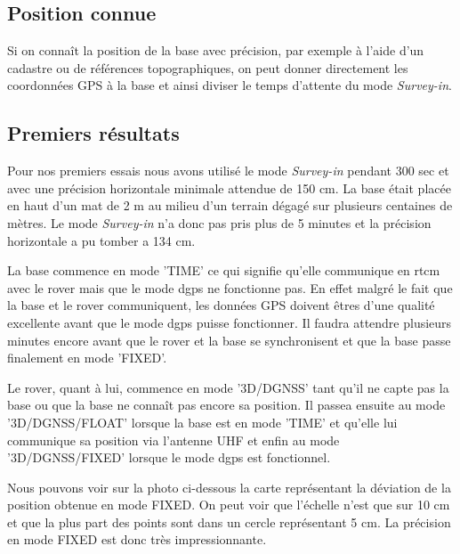 \subsection{Position connue}
Si on connaît la position de la base avec précision, par exemple à l'aide d'un
cadastre ou de références topographiques, on peut donner directement les
coordonnées GPS à la base et ainsi diviser le temps d'attente du mode
\textit{Survey-in}.


\subsection{Premiers résultats}
Pour nos premiers essais nous avons utilisé le mode \textit{Survey-in} pendant
300 sec et avec une précision horizontale minimale attendue de 150 cm. La base
était placée en haut d'un mat de 2 m au milieu d'un terrain dégagé sur
plusieurs centaines de mètres. Le mode \textit{Survey-in} n'a donc pas pris
plus de 5 minutes et la précision horizontale a pu tomber a 134 cm.

La base commence en mode 'TIME' ce qui signifie qu'elle communique en
\gls{rtcm} avec le rover mais que le mode \gls{dgps} ne fonctionne pas. En
effet malgré le fait que la base et le rover  communiquent, les données GPS
doivent êtres d'une qualité excellente avant que le mode \gls{dgps} puisse
fonctionner. Il faudra attendre plusieurs minutes encore avant que le rover et
la base se synchronisent et que la base passe finalement en mode 'FIXED'.

Le rover, quant à lui, commence en mode '3D/DGNSS' tant qu'il ne capte pas la
base ou que la base ne connaît pas encore sa position. Il passea ensuite au
mode '3D/DGNSS/FLOAT' lorsque la base est en mode 'TIME' et qu'elle lui
communique sa position via l'antenne UHF et enfin au mode '3D/DGNSS/FIXED'
lorsque le mode \gls{dgps} est fonctionnel.

Nous pouvons voir sur la photo ci-dessous la carte représentant la déviation de
la position obtenue en mode FIXED. On peut voir que l'échelle n'est que sur 10
cm et que la plus part des points sont dans un cercle représentant 5 cm. La
précision en mode FIXED est donc très impressionnante.

